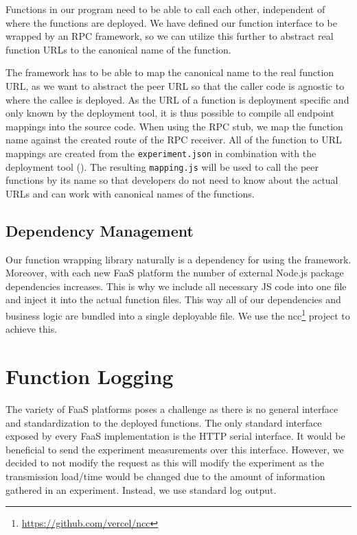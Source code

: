 \documentclass[../main.tex]{subfiles}
\begin{document}
Functions in our program need to be able to call each other, independent of where the functions are deployed. 
We have defined our function interface to be wrapped by an RPC framework, 
so we can utilize this further to abstract real function URLs to the canonical name of the function. 

The framework has to be able to map the canonical name to the real function URL, 
as we want to abstract the peer URL so that the caller code is agnostic to where the callee is deployed. 
As the URL of a function is deployment specific and only known by the deployment tool, 
it is thus possible to compile all endpoint mappings into the source code. 
When using the RPC stub, we map the function name against the created route of the RPC receiver. 
All of the function to URL mappings are created from the \texttt{experiment.json} in combination with the deployment tool
(). 
The resulting \texttt{mapping.js} will be used to call the peer functions by its name so that developers
do not need to know about the actual URLs and can work with canonical names of the functions.

\subsection{Dependency Management}%
\label{sub:designLibsDeps}

Our function wrapping library naturally is a dependency for using the framework.
Moreover, with each new FaaS platform the number of external Node.js 
package dependencies increases.
This is why we include all necessary JS code into one file and inject it into the actual function files. 
This way all of our dependencies and business logic are bundled into a single deployable file. 
We use the ncc\footnote{\url{https://github.com/vercel/ncc}} project to achieve this.

\section{Function Logging}%
\label{sec:functionLogging}

The variety of FaaS platforms poses a challenge as there is no general interface and standardization to the deployed functions. 
The only standard interface exposed by every FaaS implementation is the HTTP serial interface. 
It would be beneficial to send the experiment measurements over this interface. 
However, we decided to not modify the request as this will modify the experiment as the transmission load/time 
would be changed due to the amount of information gathered in an experiment.
Instead, we use standard log output.
\end{document}
